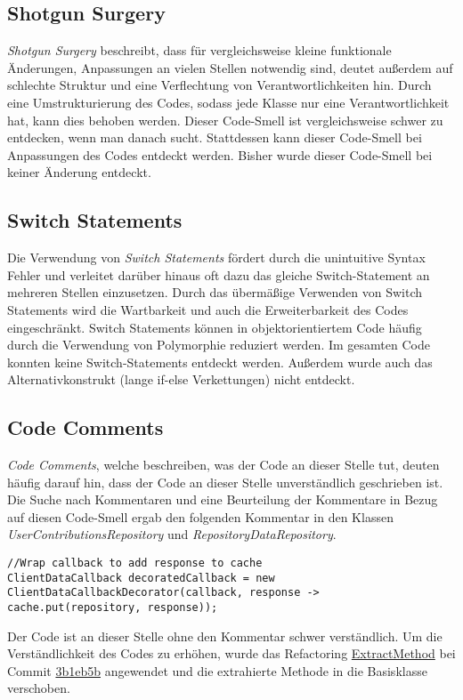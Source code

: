\subsection{Shotgun Surgery}

\textit{Shotgun Surgery} beschreibt, dass für vergleichsweise kleine funktionale Änderungen, Anpassungen an vielen Stellen notwendig sind, deutet außerdem auf schlechte Struktur und eine Verflechtung von Verantwortlichkeiten hin.
Durch eine Umstrukturierung des Codes, sodass jede Klasse nur eine Verantwortlichkeit hat, kann dies behoben werden.
\newline
\newline
Dieser Code-Smell ist vergleichsweise schwer zu entdecken, wenn man danach sucht.
Stattdessen kann dieser Code-Smell bei Anpassungen des Codes entdeckt werden.
Bisher wurde dieser Code-Smell bei keiner Änderung entdeckt.

\subsection{Switch Statements}

Die Verwendung von \textit{Switch Statements} fördert durch die unintuitive Syntax Fehler und verleitet darüber hinaus oft dazu das gleiche Switch-Statement an mehreren Stellen einzusetzen.
Durch das übermäßige Verwenden von Switch Statements wird die Wartbarkeit und auch die Erweiterbarkeit des Codes eingeschränkt.
Switch Statements können in objektorientiertem Code häufig durch die Verwendung von Polymorphie reduziert werden.
\newline
\newline
Im gesamten Code konnten keine Switch-Statements entdeckt werden. Außerdem wurde auch das Alternativkonstrukt (lange if-else Verkettungen) nicht entdeckt.

\subsection{Code Comments}

\textit{Code Comments}, welche beschreiben, was der Code an dieser Stelle tut, deuten häufig darauf hin, dass der Code an dieser Stelle unverständlich geschrieben ist.
\newline
\newline
Die Suche nach Kommentaren und eine Beurteilung der Kommentare in Bezug auf diesen Code-Smell ergab den folgenden Kommentar in den Klassen \textit{UserContributionsRepository} und \textit{RepositoryDataRepository}.
\begin{lstlisting}
//Wrap callback to add response to cache
ClientDataCallback decoratedCallback = new ClientDataCallbackDecorator(callback, response ->  cache.put(repository, response));
\end{lstlisting}
Der Code ist an dieser Stelle ohne den Kommentar schwer verständlich.
Um die Verständlichkeit des Codes zu erhöhen, wurde das Refactoring {\hyperref[sec:ExtractMethod_Repository]{ExtractMethod}} bei Commit \href{https://github.com/lukaspanni/OpenSourceStats/commit/3b1eb5bf6750c3ccaeb05962ec8a8ae743adbf2c} {3b1eb5b} angewendet und die extrahierte Methode in die Basisklasse verschoben.


